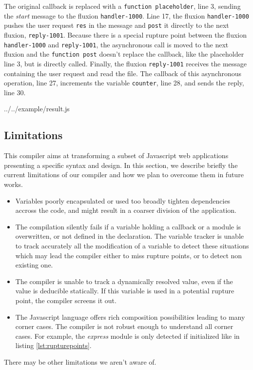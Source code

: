 The original callback is replaced with a \texttt{function placeholder}, line 3, sending the \textit{start} message to the fluxion \texttt{handler-1000}.
Line 17, the fluxion \texttt{handler-1000} pushes the user request \texttt{res} in the message and \texttt{post} it directly to the next fluxion, \texttt{reply-1001}.
Because there is a special rupture point between the fluxion \texttt{handler-1000} and \texttt{reply-1001}, the asynchronous call is moved to the next fluxion and the \texttt{function post} doesn't replace the callback, like the placeholder line 3, but is directly called.
Finally, the fluxion \texttt{reply-1001} receives the message containing the user request and read the file.
The callback of this asynchronous operation, line 27, increments the variable \texttt{counter}, line 28, and sends the reply, line 30.

{../../example/result.js}

\subsection{Limitations}

This compiler aims at transforming a subset of Javascript web applications presenting a specific syntax and design.
In this section, we describe briefly the current limitations of our compiler and how we plan to overcome them in future works.

\begin{itemize}
  \item Variables poorly encapsulated or used too broadly tighten dependencies accross the code, and might result in a coarser division of the application.
  \item The compilation silently fails if a variable holding a callback or a module is overwritten, or not defined in the declaration.
        The variable tracker is unable to track accurately all the modification of a variable to detect these situations which may lead the compiler either to miss rupture points, or to detect non existing one.
  \item The compiler is unable to track a dynamically resolved value, even if the value is deducible statically.
        If this variable is used in a potential rupture point, the compiler screens it out.
  \item The Javascript language offers rich composition possibilities leading to many corner cases.
        The compiler is not robust enough to understand all corner cases.
        For example, the \textit{express} module is only detected if initialized like in listing \ref{lst:rupturepoints}.
\end{itemize}
There may be other limitations we aren't aware of.

